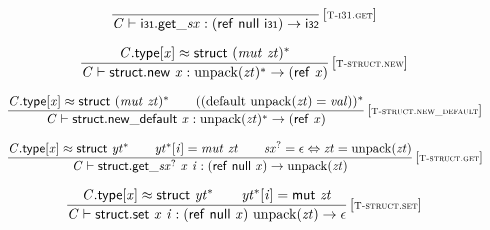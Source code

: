 \vspace{1ex}

$$
\begin{array}{@{}c@{}}\displaystyle
\frac{
}{
{\mathit{C}} \vdash {{\mathsf{i{\scriptstyle31}.get}}{\mathsf{\_}}}{{\mathit{sx}}} : (\mathsf{ref}~\mathsf{null}~\mathsf{i{\scriptstyle31}}) \rightarrow \mathsf{i{\scriptstyle32}}
} \, {[\textsc{\scriptsize T{-}i31.get}]}
\qquad
\end{array}
$$

\vspace{1ex}

$$
\begin{array}{@{}c@{}}\displaystyle
\frac{
{\mathit{C}}.\mathsf{type}[{\mathit{x}}] \approx \mathsf{struct}~{({\mathit{mut}}~{\mathit{zt}})^\ast}
}{
{\mathit{C}} \vdash \mathsf{struct.new}~{\mathit{x}} : {{\mathrm{unpack}}({\mathit{zt}})^\ast} \rightarrow (\mathsf{ref}~{\mathit{x}})
} \, {[\textsc{\scriptsize T{-}struct.new}]}
\qquad
\end{array}
$$

$$
\begin{array}{@{}c@{}}\displaystyle
\frac{
{\mathit{C}}.\mathsf{type}[{\mathit{x}}] \approx \mathsf{struct}~{({\mathit{mut}}~{\mathit{zt}})^\ast}
 \qquad
(({\mathrm{default}}~{\mathrm{unpack}}({\mathit{zt}}) = {\mathit{val}}))^\ast
}{
{\mathit{C}} \vdash \mathsf{struct.new\_default}~{\mathit{x}} : {{\mathrm{unpack}}({\mathit{zt}})^\ast} \rightarrow (\mathsf{ref}~{\mathit{x}})
} \, {[\textsc{\scriptsize T{-}struct.new\_default}]}
\qquad
\end{array}
$$

$$
\begin{array}{@{}c@{}}\displaystyle
\frac{
{\mathit{C}}.\mathsf{type}[{\mathit{x}}] \approx \mathsf{struct}~{{\mathit{yt}}^\ast}
 \qquad
{{\mathit{yt}}^\ast}[{\mathit{i}}] = {\mathit{mut}}~{\mathit{zt}}
 \qquad
{{\mathit{sx}}^?} = \epsilon \Leftrightarrow {\mathit{zt}} = {\mathrm{unpack}}({\mathit{zt}})
}{
{\mathit{C}} \vdash {{\mathsf{struct.get}}{\mathsf{\_}}}{{{\mathit{sx}}^?}}~{\mathit{x}}~{\mathit{i}} : (\mathsf{ref}~\mathsf{null}~{\mathit{x}}) \rightarrow {\mathrm{unpack}}({\mathit{zt}})
} \, {[\textsc{\scriptsize T{-}struct.get}]}
\qquad
\end{array}
$$

$$
\begin{array}{@{}c@{}}\displaystyle
\frac{
{\mathit{C}}.\mathsf{type}[{\mathit{x}}] \approx \mathsf{struct}~{{\mathit{yt}}^\ast}
 \qquad
{{\mathit{yt}}^\ast}[{\mathit{i}}] = \mathsf{mut}~{\mathit{zt}}
}{
{\mathit{C}} \vdash \mathsf{struct.set}~{\mathit{x}}~{\mathit{i}} : (\mathsf{ref}~\mathsf{null}~{\mathit{x}})~{\mathrm{unpack}}({\mathit{zt}}) \rightarrow \epsilon
} \, {[\textsc{\scriptsize T{-}struct.set}]}
\qquad
\end{array}
$$

